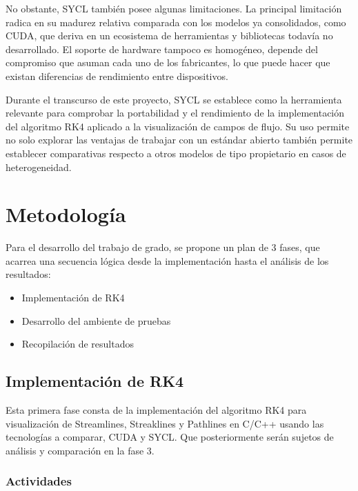 \documentclass[12pt]{article}
\begin{document}
No obstante, SYCL también posee algunas limitaciones. La principal limitación radica en su madurez relativa comparada con los modelos ya consolidados, como CUDA, que deriva en un ecosistema de herramientas y bibliotecas todavía no desarrollado. El soporte de hardware tampoco es homogéneo, depende del compromiso que asuman cada uno de los fabricantes, lo que puede hacer que existan diferencias de rendimiento entre dispositivos.

Durante el transcurso de este proyecto, SYCL se establece como la herramienta relevante para comprobar la portabilidad y el rendimiento de la implementación del algoritmo RK4 aplicado a la visualización de campos de flujo. Su uso permite no solo explorar las ventajas de trabajar con un estándar abierto también permite establecer comparativas respecto a otros modelos de tipo propietario en casos de heterogeneidad.

\pagebreak

\section{Metodología}


Para el desarrollo del trabajo de grado, se propone un plan de 3 fases, que acarrea una secuencia lógica desde la implementación hasta el análisis de los resultados:
\begin{itemize}
	\item Implementación de RK4
	\item Desarrollo del ambiente de pruebas
	\item Recopilación de resultados
\end{itemize}

% 	

\subsection{Implementación de RK4}

Esta primera fase consta de la implementación del algoritmo RK4 para visualización de Streamlines, Streaklines y Pathlines en C/C++ usando las tecnologías a comparar, CUDA y SYCL. Que posteriormente serán sujetos de análisis y comparación en la fase 3.

\subsubsection*{Actividades}
\end{document}

